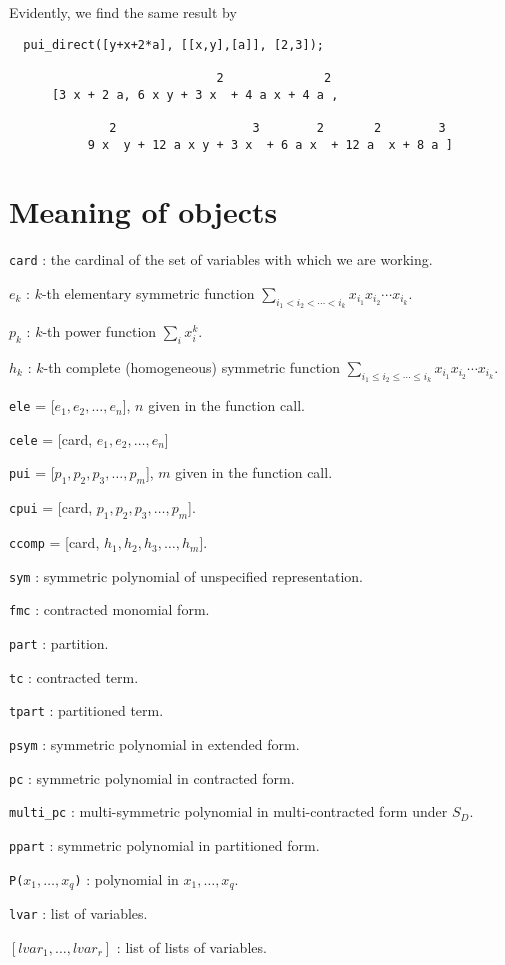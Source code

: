 \documentclass[11pt]{article}
\begin{document}
\normalsize 
Evidently, we find the same result by
\small
\begin{verbatim}
  pui_direct([y+x+2*a], [[x,y],[a]], [2,3]);

                             2              2
      [3 x + 2 a, 6 x y + 3 x  + 4 a x + 4 a , 

              2                   3        2       2        3
           9 x  y + 12 a x y + 3 x  + 6 a x  + 12 a  x + 8 a ]
\end{verbatim}
\normalsize


\newpage
\section{Meaning of objects}

\begin{flushleft}
\texttt{card} : the cardinal of the set of variables with which we are working.

\texttt{$e_k$} : $k$-th elementary symmetric function $\sum_{i_1<i_2<\cdots<
i_k} x_{i_1} x_{i_2} \cdots x_{i_k}$.

\texttt{$p_k$} : $k$-th power function $\sum_i x_i^k$.

\texttt{$h_k$} : $k$-th complete (homogeneous) symmetric function $\sum_{i_1\le
i_2\le \cdots\le i_k} x_{i_1} x_{i_2} \cdots x_{i_k}$.

\texttt{ele} = [$e_1,e_2,\ldots,e_n$], $n$ given in the function call.

\texttt{cele} = [card, $e_1,e_2,\ldots,e_n$]

\texttt{pui} = [$p_1,p_2,p_3,\ldots,p_m$], $m$ given in the function call.

\texttt{cpui} = [card, $p_{1},p_{2},p_{3},\ldots,p_{m}$].

\texttt{ccomp} = [card, $h_{1},h_{2},h_{3},\ldots,h_{m}$].

\texttt{sym} : symmetric polynomial of unspecified representation.

\texttt{fmc} : contracted monomial form.

\texttt{part} : partition.

\texttt{tc} : contracted term.

\texttt{tpart} : partitioned term.

\texttt{psym} : symmetric polynomial in extended form.

\texttt{pc} : symmetric polynomial in contracted form.

\texttt{multi\_pc} : multi-symmetric polynomial in multi-contracted form under
$S_D$.

\texttt{ppart} : symmetric polynomial in partitioned form.

\texttt{P($x_1,\ldots,x_q$)} : polynomial in $x_1,\ldots,x_q$.

\texttt{lvar} : list of variables.

$[lvar_1, \ldots,lvar_r]$ : list of lists of variables.
\end{flushleft}


\printindex
\end{document}
